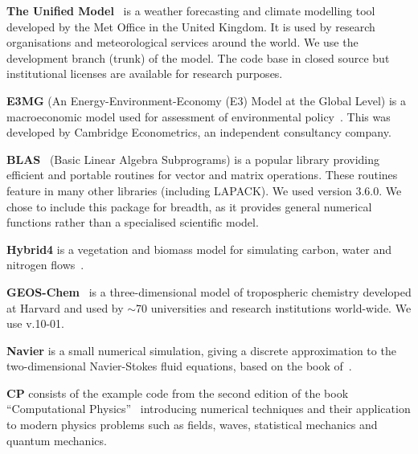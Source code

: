 \documentclass[9pt]{sigplanconf}
\theoremstyle{definition}
\begin{document}
\textbf{The Unified
  Model}~\cite{um}
is a weather forecasting and climate modelling tool developed by the
Met Office in the United Kingdom. It is used by research organisations
and meteorological services around the world. We use the development
branch (trunk) of the model. The code base in closed source but
institutional licenses are available for research purposes. %

\textbf{E3MG} (An Energy-Environment-Economy (E3) Model at the Global Level) is a macroeconomic model used for assessment of environmental policy~\cite{RePEc:aen:journl:2006se-a12}. This was developed by Cambridge Econometrics, an independent consultancy company.

\textbf{BLAS}~\cite{blas} (Basic Linear Algebra Subprograms) is a popular
library providing efficient and portable routines for vector and
matrix operations. These routines feature in many other libraries
(including LAPACK). We used version 3.6.0. We chose to include this
package for breadth, as it provides general numerical functions rather
than a specialised scientific model. 

\textbf{Hybrid4} is a vegetation and biomass model for simulating carbon, water and nitrogen flows~\cite{GBC:GBC635}.

\textbf{GEOS-Chem}~\cite{geos-chem} is a three-dimensional model of
tropospheric chemistry developed at Harvard and used by $\sim$70
universities and research institutions world-wide. We use v.10-01.

\textbf{Navier} is a small numerical simulation, giving a discrete
approximation to the two-dimensional Navier-Stokes fluid equations,
based on the book of~\citet{griebel1997numerical}.

\textbf{CP} consists of the example code from the second edition of the book ``Computational Physics''~\cite{nicholas2006computational} introducing numerical techniques and their application to modern physics problems such as fields, waves, statistical mechanics and quantum mechanics.

\end{document}
